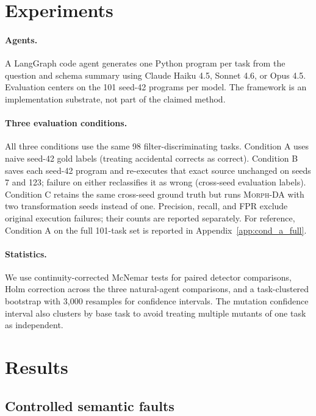 \documentclass{article}
\newcommand{\morph}{\textsc{Morph-DA}\xspace}
\begin{document}
\section{Experiments}
\label{sec:experiments}

\paragraph{Agents.}
A LangGraph code agent generates one Python program per task from the question and schema summary using Claude Haiku 4.5, Sonnet 4.6, or Opus 4.5. Evaluation centers on the 101 seed-42 programs per model. The framework is an implementation substrate, not part of the claimed method.

\paragraph{Three evaluation conditions.}
All three conditions use the same 98 filter-discriminating tasks. Condition A uses naive seed-42 gold labels (treating accidental corrects as correct). Condition B saves each seed-42 program and re-executes that exact source unchanged on seeds 7 and 123; failure on either reclassifies it as wrong (cross-seed evaluation labels). Condition C retains the same cross-seed ground truth but runs \morph with two transformation seeds instead of one. Precision, recall, and FPR exclude original execution failures; their counts are reported separately. For reference, Condition A on the full 101-task set is reported in Appendix~\ref{app:cond_a_full}.

\paragraph{Statistics.}
We use continuity-corrected McNemar tests for paired detector comparisons, Holm correction across the three natural-agent comparisons, and a task-clustered bootstrap with 3,000 resamples for confidence intervals. The mutation confidence interval also clusters by base task to avoid treating multiple mutants of one task as independent.

\section{Results}
\label{sec:results}

\subsection{Controlled semantic faults}
\end{document}
